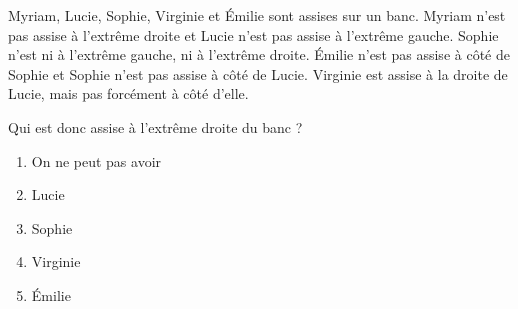 Myriam, Lucie, Sophie, Virginie et \'Emilie sont assises sur un banc. Myriam n'est pas assise à l'extrême droite et Lucie n'est pas assise à l'extrême gauche. Sophie n'est ni à l'extrême gauche, ni à l'extrême droite. \'Emilie n'est pas assise à côté de Sophie et Sophie n'est pas assise à côté de Lucie. Virginie est assise à la droite de Lucie, mais pas forcément à côté d'elle.
\par Qui est donc assise à l'extrême droite du banc ?
\begin{multicols}{5}
  \begin{enumerate}[A/]
  \item On ne peut pas avoir
  \item Lucie
  \item Sophie
  \item Virginie
  \item \'Emilie
  \end{enumerate}
\end{multicols}